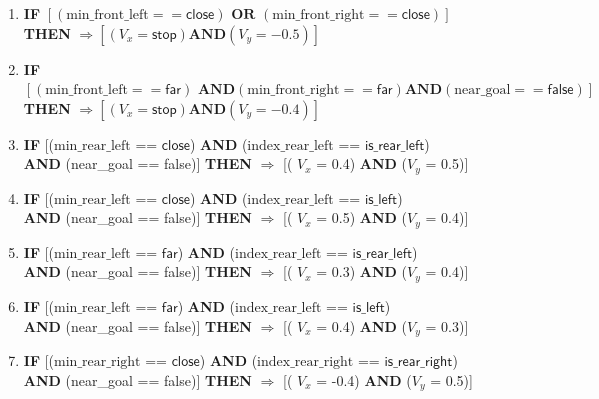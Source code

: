 \begin{enumerate}
    \small
	\item \textbf{IF} $\left[\left( \text{min\_front\_left} == \textsf{close}\right) \textbf{ OR } \left(\text{min\_front\_right} == \textsf{close}\right)\right]$\\ 
	\textbf{THEN} $\Rightarrow\left[\left( V_x = \textsf{stop} \right) \textbf{AND} \left(V_y = -0.5\right)\right]$
	
	\item \textbf{IF} $ \left[\left( \text{min\_front\_left} == \textsf{far}\right) \textbf{ AND} \left(\text{min\_front\_right} == \textsf{far}\right) \textbf{AND} \left(\text{near\_goal} == \textsf{false}\right)
	\right]$\\ 
	\textbf{THEN} $\Rightarrow\left[\left( V_x = \textsf{stop} \right) \textbf{AND} \left(V_y = -0.4\right)\right]$
	
	\item \textbf{IF} [($\text{min\_rear\_left}$ == $\textsf{close}$) \textbf{AND} ($\text{index\_rear\_left}$ == $\textsf{is\_rear\_left}$)\\
	\textbf{AND} (near\_goal == \textsf{false})]
	\textbf{THEN} $\Rightarrow$ [( $V_x$ = \textsf{0.4}) \textbf{AND} ($V_y$ = \textsf{0.5})]
	
	\item \textbf{IF} [($\text{min\_rear\_left}$ == $\textsf{close}$) \textbf{AND} ($\text{index\_rear\_left}$ == $\textsf{is\_left}$)\\
	\textbf{AND} (near\_goal == \textsf{false})]		\textbf{THEN} $\Rightarrow$ [( $V_x$ = \textsf{0.5}) \textbf{AND} ($V_y$ = \textsf{0.4})]

	\item \textbf{IF} [($\text{min\_rear\_left}$ == $\textsf{far}$) \textbf{AND} ($\text{index\_rear\_left}$ == $\textsf{is\_rear\_left}$)\\
	\textbf{AND} (near\_goal == \textsf{false})]
	\textbf{THEN} $\Rightarrow$ [( $V_x$ = \textsf{0.3}) \textbf{AND} ($V_y$ = \textsf{0.4})]

	\item \textbf{IF} [($\text{min\_rear\_left}$ == $\textsf{far}$) \textbf{AND} ($\text{index\_rear\_left}$ == $\textsf{is\_left}$)\\
	\textbf{AND} (near\_goal == \textsf{false})]
	\textbf{THEN} $\Rightarrow$ [( $V_x$ = \textsf{0.4}) \textbf{AND} ($V_y$ = \textsf{0.3})]

	\item \textbf{IF} [($\text{min\_rear\_right}$ == $\textsf{close}$) \textbf{AND} ($\text{index\_rear\_right}$ == $\textsf{is\_rear\_right}$)\\
	\textbf{AND} (near\_goal == \textsf{false})]
	\textbf{THEN} $\Rightarrow$ [( $V_x$ = \textsf{-0.4}) \textbf{AND} ($V_y$ = \textsf{0.5})]	
	

\end{enumerate}
